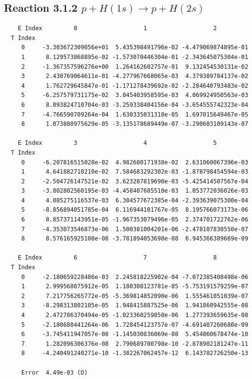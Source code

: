 \documentclass[12pt,dvipdfmx]{article}
\begin{document}
\newpage
\subsection{
Reaction 3.1.2 $   p + H(1s) \rightarrow p + H(2s)$}


\begin{small}\begin{verbatim}
    E Index         0                   1                   2
  T Index
     0     -3.303672309056e+01  5.435398491796e-02 -4.479069874895e-01
     1      8.129573868895e-02 -1.573070446304e-01 -2.343645075304e-01
     2     -1.367357596276e+00  1.264162602757e-01  9.132454530131e-02
     3      2.430769064611e-01 -4.277967668065e-03  4.379389784137e-02
     4      1.762729645847e-01 -1.171278439692e-02 -2.284640793483e-02
     5     -6.257579731175e-02  3.045403958595e-03  4.069924950563e-03
     6      8.093824710704e-03 -3.259338404156e-04 -3.654555742323e-04
     7     -4.766590709264e-04  1.630335031310e-05  1.697015649467e-05
     8      1.073880975629e-05 -3.135178689449e-07 -3.290603109143e-07

    E Index         3                   4                   5
  T Index
     0     -6.207816515028e-02  4.982680171938e-02  2.631060067396e-03
     1      4.641882710210e-02  7.584683292302e-03 -1.878798454594e-03
     2     -2.504726147521e-02  3.623287819690e-03 -5.425414507567e-04
     3     -3.802802560195e-03 -4.458407685510e-03  1.053772036026e-03
     4      4.085275116537e-03  6.304577672385e-04 -2.393639075300e-04
     5     -8.856894051785e-04  6.116944101767e-05  8.195766073173e-06
     6      8.857371143951e-05 -1.967353079496e-05  2.374701722762e-06
     7     -4.353073546873e-06  1.500381004201e-06 -2.478107830550e-07
     8      8.576165925108e-08 -3.781894053698e-08  6.945366389669e-09

    E Index         6                   7                   8
  T Index
     0     -2.180659228486e-03  2.245818225902e-04 -7.072385408498e-06
     1      2.999568075912e-05  1.180308123781e-05 -5.753191579259e-07
     2      7.217756265772e-05 -5.369814852090e-06  1.555461051039e-07
     3     -8.298313802105e-05  1.948415887525e-06  1.941860942555e-08
     4      2.472786370494e-05 -1.023360259850e-06  1.277393659635e-08
     5     -2.180680441264e-06  1.728454123757e-07 -4.691407260680e-09
     6     -3.745411947057e-08 -1.145030836069e-08  5.454860678474e-10
     7      1.282096306376e-08  2.790689700798e-10 -2.878902181247e-11
     8     -4.240491240271e-10 -1.382267062457e-12  6.143782726250e-13

     Error  4.49e-03 (D)
\end{verbatim}\end{small}
\end{document}
